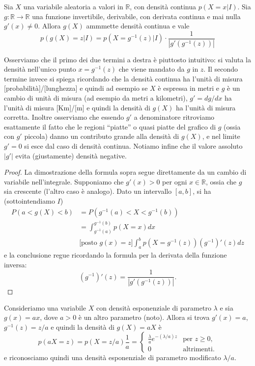 \documentclass[
  italian,
  letterpaper,
]{book}
\newcommand{\R}{\mathbb{R}}
\theoremstyle{definition}
\theoremstyle{remark}
\begin{document}
Sia \(X\) una variabile aleatoria a valori in \(\R\), con densità
continua \(p(X=x|I)\). Sia \(g: \R \to \R\) una funzione invertibile,
derivabile, con derivata continua e mai nulla \(g'(x)\neq 0\). Allora
\(g(X)\) ammmette densità continua e vale
\[ p(g(X) = z | I) = p( X  = g^{-1}(z) |I) \cdot\frac{1}{|g'(g^{-1}(z))|} \]

Osserviamo che il primo dei due termini a destra è piuttosto intuitivo:
si valuta la densità nell'unico punto \(x = g^{-1}(z)\) che viene
mandato da \(g\) in \(z\). Il secondo termine invece si spiega
ricordando che la densità continua ha l'unità di misura
{[}probabilità{]}/{[}lunghezza{]} e quindi ad esempio se \(X\) è
espressa in metri e \(g\) è un cambio di unità di misura (ad esempio da
metri a kilometri), \(g' = dg/dx\) ha l'unità di misura {[}Km{]}/{[}m{]}
e quindi la densità di \(g(X)\) ha l'unità di misura corretta. Inoltre
osserviamo che essendo \(g'\) a denominatore ritroviamo esattamente il
fatto che le regioni ``piatte'' o quasi piatte del grafico di \(g\)
(ossia con \(g'\) piccola) danno un contributo grande alla densità di
\(g(X)\), e nel limite \(g'=0\) si esce dal caso di densità continua.
Notiamo infine che il valore assoluto \(|g'|\) evita (giustamente)
densità negative.

\begin{proof}
La dimostrazione della formula sopra segue direttamente da un cambio di
variabile nell'integrale. Supponiamo che \(g'(x)>0\) per ogni
\(x \in \R\), ossia che \(g\) sia crescente (l'altro caso è analogo).
Dato un intervallo \([a,b]\), si ha (sottointendiamo \(I\))
\[\begin{split} P( a < g(X) < b ) &= P( g^{-1}(a) < X < g^{-1}(b))\\
& = \int_{g^{-1}(a)}^{g^{-1}(b)} p(X = x) dx \\
& \text{[posto $g(x) = z$]} \int_a^b p(X = g^{-1}(z)) (g^{-1})'(z) d z
\end{split}\] e la conclusione regue ricordando la formula per la
derivata della funzione inversa:
\[ (g^{-1})'(z) = \frac{1}{|g'(g^{-1}(z))|}.\]
\end{proof}

Consideriamo una variabile \(X\) con densità esponenziale di parametro
\(\lambda\) e sia \(g(x) = a x\), dove \(a>0\) è un altro parametro
(noto). Allora si trova \(g'(x) = a\), \(g^{-1}(z) = z/a\) e quindi la
densità di \(g(X) = aX\) è
\[ p( aX = z ) = p(X = z/a) \frac{1}{a} = \begin{cases} \frac{\lambda}{a} e^{-(\lambda/a) z} & \text{per $z \ge 0$,}\\
0 & \text{altrimenti.}
\end{cases}\] e riconosciamo quindi una densità esponenziale di
parametro modificato \(\lambda/a\).
\end{document}
